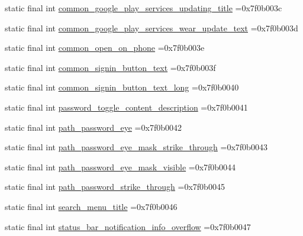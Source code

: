\begin{DoxyCompactItemize}
\item 
static final int \mbox{\hyperlink{classbr_1_1unb_1_1cic_1_1mp_1_1marketmaster_1_1test_1_1R_1_1string_a2edf8743d599578a8f26eafcbbc7341a}{common\+\_\+google\+\_\+play\+\_\+services\+\_\+updating\+\_\+title}} =0x7f0b003c
\item 
static final int \mbox{\hyperlink{classbr_1_1unb_1_1cic_1_1mp_1_1marketmaster_1_1test_1_1R_1_1string_afe13f1ae4d9271ed40638918220807de}{common\+\_\+google\+\_\+play\+\_\+services\+\_\+wear\+\_\+update\+\_\+text}} =0x7f0b003d
\item 
static final int \mbox{\hyperlink{classbr_1_1unb_1_1cic_1_1mp_1_1marketmaster_1_1test_1_1R_1_1string_affe6799e1c947fa1e23bfb01c0fca2b9}{common\+\_\+open\+\_\+on\+\_\+phone}} =0x7f0b003e
\item 
static final int \mbox{\hyperlink{classbr_1_1unb_1_1cic_1_1mp_1_1marketmaster_1_1test_1_1R_1_1string_aeda48c99daf17feeabbfd09451e05c24}{common\+\_\+signin\+\_\+button\+\_\+text}} =0x7f0b003f
\item 
static final int \mbox{\hyperlink{classbr_1_1unb_1_1cic_1_1mp_1_1marketmaster_1_1test_1_1R_1_1string_a7e21a05279feee5b199f7800c15a2c16}{common\+\_\+signin\+\_\+button\+\_\+text\+\_\+long}} =0x7f0b0040
\item 
static final int \mbox{\hyperlink{classbr_1_1unb_1_1cic_1_1mp_1_1marketmaster_1_1test_1_1R_1_1string_a7ffc9d4a2d33689cb5d7dfc83b4cc553}{password\+\_\+toggle\+\_\+content\+\_\+description}} =0x7f0b0041
\item 
static final int \mbox{\hyperlink{classbr_1_1unb_1_1cic_1_1mp_1_1marketmaster_1_1test_1_1R_1_1string_adb4845ecb7f4da506aaa09931818f3bf}{path\+\_\+password\+\_\+eye}} =0x7f0b0042
\item 
static final int \mbox{\hyperlink{classbr_1_1unb_1_1cic_1_1mp_1_1marketmaster_1_1test_1_1R_1_1string_a581c9e6399517aa0c8c824cedf507bef}{path\+\_\+password\+\_\+eye\+\_\+mask\+\_\+strike\+\_\+through}} =0x7f0b0043
\item 
static final int \mbox{\hyperlink{classbr_1_1unb_1_1cic_1_1mp_1_1marketmaster_1_1test_1_1R_1_1string_ae905f403a055f38c2a54a7c343c1bb44}{path\+\_\+password\+\_\+eye\+\_\+mask\+\_\+visible}} =0x7f0b0044
\item 
static final int \mbox{\hyperlink{classbr_1_1unb_1_1cic_1_1mp_1_1marketmaster_1_1test_1_1R_1_1string_a13b1af7ec6046e23afa7fcf3525a1b79}{path\+\_\+password\+\_\+strike\+\_\+through}} =0x7f0b0045
\item 
static final int \mbox{\hyperlink{classbr_1_1unb_1_1cic_1_1mp_1_1marketmaster_1_1test_1_1R_1_1string_a0eef8da4f3f5cc8aae456269b03d46f7}{search\+\_\+menu\+\_\+title}} =0x7f0b0046
\item 
static final int \mbox{\hyperlink{classbr_1_1unb_1_1cic_1_1mp_1_1marketmaster_1_1test_1_1R_1_1string_a3f7125db7ba633c057c535f686e12169}{status\+\_\+bar\+\_\+notification\+\_\+info\+\_\+overflow}} =0x7f0b0047
\end{DoxyCompactItemize}


